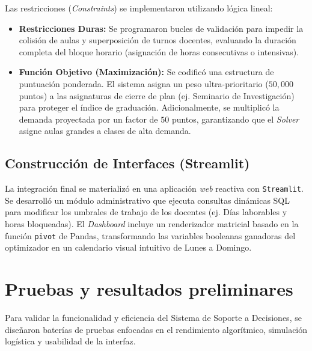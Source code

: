 Las restricciones (\textit{Constraints}) se implementaron utilizando lógica lineal:
\begin{itemize}
    \item \textbf{Restricciones Duras:} Se programaron bucles de validación para impedir la colisión de aulas y superposición de turnos docentes, evaluando la duración completa del bloque horario (asignación de horas consecutivas o intensivas).
    \item \textbf{Función Objetivo (Maximización):} Se codificó una estructura de puntuación ponderada. El sistema asigna un peso ultra-prioritario ($50,000$ puntos) a las asignaturas de cierre de plan (ej. Seminario de Investigación) para proteger el índice de graduación. Adicionalmente, se multiplicó la demanda proyectada por un factor de $50$ puntos, garantizando que el \textit{Solver} asigne aulas grandes a clases de alta demanda.
\end{itemize}

\subsection{Construcción de Interfaces (Streamlit)}
La integración final se materializó en una aplicación \textit{web} reactiva con \texttt{Streamlit}. Se desarrolló un módulo administrativo que ejecuta consultas dinámicas SQL para modificar los umbrales de trabajo de los docentes (ej. Días laborables y horas bloqueadas). El \textit{Dashboard} incluye un renderizador matricial basado en la función \texttt{pivot} de Pandas, transformando las variables booleanas ganadoras del optimizador en un calendario visual intuitivo de Lunes a Domingo.

\section{Pruebas y resultados preliminares}
Para validar la funcionalidad y eficiencia del Sistema de Soporte a Decisiones, se diseñaron baterías de pruebas enfocadas en el rendimiento algorítmico, simulación logística y usabilidad de la interfaz.

